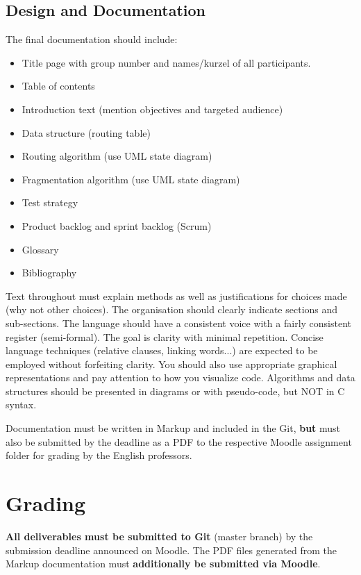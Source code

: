 \documentclass{article}
\begin{document}
\subsection{Design and Documentation}

The final documentation should include:
  \begin{itemize}
  \item Title page with group number and names/kurzel of all participants.
  \item Table of contents
  \item Introduction text (mention objectives and targeted audience)
  \item Data structure (routing table)
  \item Routing algorithm (use UML state diagram)
  \item Fragmentation algorithm (use UML state diagram)
  \item Test strategy
  \item Product backlog and sprint backlog (Scrum)
  \item Glossary
  \item Bibliography
\end{itemize}

Text throughout must explain methods as well as justifications for
choices made (why not other choices). The organisation should clearly
indicate sections and sub-sections.  The language should have a
consistent voice with a fairly consistent register (semi-formal).  The
goal is clarity with minimal repetition.  Concise language techniques
(relative clauses, linking words...) are expected to be employed
without forfeiting clarity.  You should also use appropriate graphical
representations and pay attention to how you visualize code.
Algorithms and data structures should be presented in diagrams or with
pseudo-code, but NOT in C syntax.

Documentation must be written in Markup and included in the Git, {\bf
  but} must also be submitted by the deadline as a PDF to the
respective Moodle assignment folder for grading by the English
professors.



\section{Grading}

{\bf All deliverables must be submitted to Git} (master branch) by the
submission deadline announced on Moodle. The PDF files generated from
the Markup documentation must {\bf additionally be submitted via Moodle}.
\end{document}
